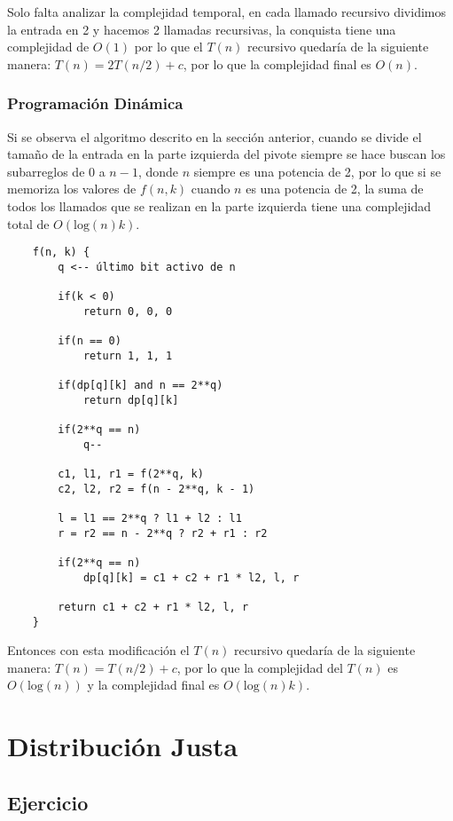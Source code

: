 \documentclass{article}
\begin{document}
Solo falta analizar la complejidad temporal, en cada llamado recursivo dividimos la entrada en 2 y hacemos 2 llamadas recursivas,
la conquista tiene una complejidad de $O(1)$ por lo que el $T(n)$ recursivo quedaría de la siguiente manera: $T(n) = 2T(n/2) + c$,
por lo que la complejidad final es $O(n)$.

\subsubsection{Programación Dinámica}

Si se observa el algoritmo descrito en la sección anterior, cuando se divide el tamaño de la entrada en la parte izquierda del pivote
siempre se hace buscan los subarreglos de 0 a $n-1$, donde $n$ siempre es una potencia de 2, por lo que si se memoriza los valores de
$f(n,k)$ cuando $n$ es una potencia de 2, la suma de todos los llamados que se realizan en la parte izquierda tiene una complejidad total
de $O(\text{log}(n)k)$.

\begin{verbatim}
    f(n, k) {
        q <-- último bit activo de n 

        if(k < 0)
            return 0, 0, 0

        if(n == 0)
            return 1, 1, 1

        if(dp[q][k] and n == 2**q)
            return dp[q][k]

        if(2**q == n) 
            q--

        c1, l1, r1 = f(2**q, k)
        c2, l2, r2 = f(n - 2**q, k - 1)

        l = l1 == 2**q ? l1 + l2 : l1
        r = r2 == n - 2**q ? r2 + r1 : r2

        if(2**q == n)
            dp[q][k] = c1 + c2 + r1 * l2, l, r  
        
        return c1 + c2 + r1 * l2, l, r 
    }
\end{verbatim}

Entonces con esta modificación el $T(n)$ recursivo quedaría de la siguiente manera: $T(n) = T(n/2) + c$,
por lo que la complejidad del $T(n)$ es $O(\text{log}(n))$ y la complejidad final es $O(\text{log}(n)k)$.

\section{Distribución Justa}

\subsection{Ejercicio}
\end{document}
